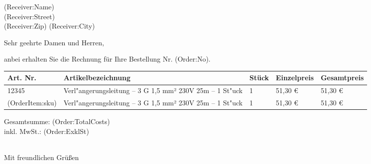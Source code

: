 \documentclass[DIN, pagenumber=false, parskip=half,%
               fromalign=right, fromphone=true, fromfax=true,
               fromrule=false]{scrlttr2}
\begin{document}
 
\begin{letter}{(Receiver:Name) \\ (Receiver:Street) \\ (Receiver:Zip) (Receiver:City)}

\opening{Sehr geehrte Damen und Herren,}

anbei erhalten Sie die Rechnung für Ihre Bestellung Nr. (Order:No). \\


\begin{longtable}{p{2.5cm}p{6.5cm}p{2cm}p{2cm}p{2cm}}

\hline 	
Art. Nr. & Artikelbezeichnung & Stück & Einzelpreis & Gesamtpreis\\
\hline 
12345 & Verl"angerungsleitung -- 3 G 1,5 mm² 230V 25m -- 1 St"uck & 1 & 51,30 \euro{} & 51,30 \euro{}\\
(OrderItem:sku) & Verl"angerungsleitung -- 3 G 1,5 mm² 230V 25m -- 1 St"uck & 1 & 51,30 \euro{} & 51,30 \euro{}\\
\hline 
\hline 
\end{longtable}
Gesamtsumme: (Order:TotalCosts)\\
inkl. MwSt.: (Order:ExklSt)\\





\closing{\\ Mit freundlichen Grüßen}
\end{letter}
 
\end{document}
